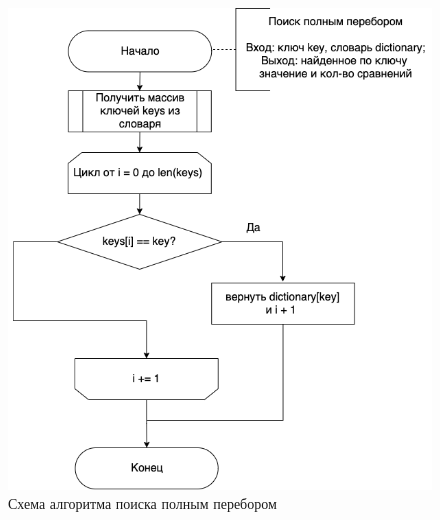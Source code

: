 \documentclass[a4paper,14pt, unknownkeysallowed]{extreport}
\begin{document}
\begin{figure}[h]
	\centering
	\includegraphics[scale=0.6]{report_files/full_search_scheme.png}
	\caption{Схема алгоритма поиска полным перебором}
	\label{fig:full_search}
\end{figure}

\clearpage
\end{document}
